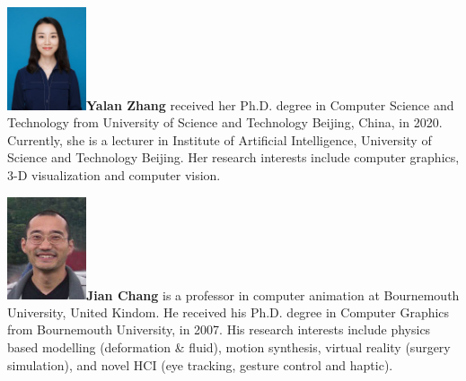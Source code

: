 \documentclass[VANCOUVER,STIX1COL]{WileyNJD-v2}
\providecommand{\DIFaddbegin}{} %
\providecommand{\DIFaddend}{} %
\providecommand{\DIFdelbegin}{} %
\providecommand{\DIFdelend}{} %
\begin{document}
\vspace{7ex}

\DIFdelbegin %
\DIFdelend \DIFaddbegin \begin{biography}{\includegraphics[width=66pt,height=86pt]{VANCOUVER/figure/photos/YalanZhang.jpg}}{\textbf{Yalan Zhang} received her Ph.D. degree in Computer Science and Technology from University of Science and Technology Beijing, China, in 2020. Currently, she is a lecturer in Institute of Artificial Intelligence, University of Science and Technology Beijing. Her research interests include computer graphics, 3-D visualization and computer vision.}
\DIFaddend \end{biography}

\vspace{7ex}

\begin{biography}{\includegraphics[width=66pt,height=86pt]{VANCOUVER/figure/photos/JianChang.jpg}}{\textbf{Jian Chang} is a professor in  computer animation at Bournemouth University, United Kindom. He received his Ph.D. degree in Computer Graphics from Bournemouth University, in 2007. His research interests include physics based modelling (deformation \& fluid), motion synthesis, virtual reality (surgery simulation), and novel HCI (eye tracking, gesture control and haptic).}
\end{biography}

\vspace{5ex}
\end{document}
